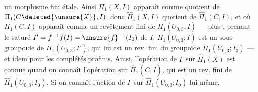un morphisme fini étale. Ainsi $\Pi_1(X,I)$ apparaît comme quotient de $\Pi_1(C\deleted{\unsure{X}},I)$, donc $\widehat\Pi_1(X,I)$ quotient de $\widehat\Pi_1(C,I)$, et où $\Pi_1(C,I)$ apparaît comme un revêtement fini de $\Pi_1(U_{0,3},I)$ --- plus  , prenant le saturé $I'=f^{-1}f(I)=\unsure{f}^{-1}(I_0)$ de $I$, $\Pi_1(U_{0,3};I)$ est un sous-groupoïde  de $\Pi_1(U_{0,3};I')$, qui lui est un rev. fini du groupoïde $\Pi_1(U_{0,3};I_0)$ --- et idem pour les complétés profinis. Ainsi, l'opération de $\Gamma$ sur $\widehat\Pi_1(X)$ est connue quand on connaît l'opération sur $\widehat\Pi_1(C,\widetilde I)$, qui est un rev. fini de $\widehat\Pi_1(U_{0,3};I_0)$. Si on connaît l'action de $\Gamma$ sur $\widehat\Pi_1(U_{0,3};I_0)$ lui-même, 
